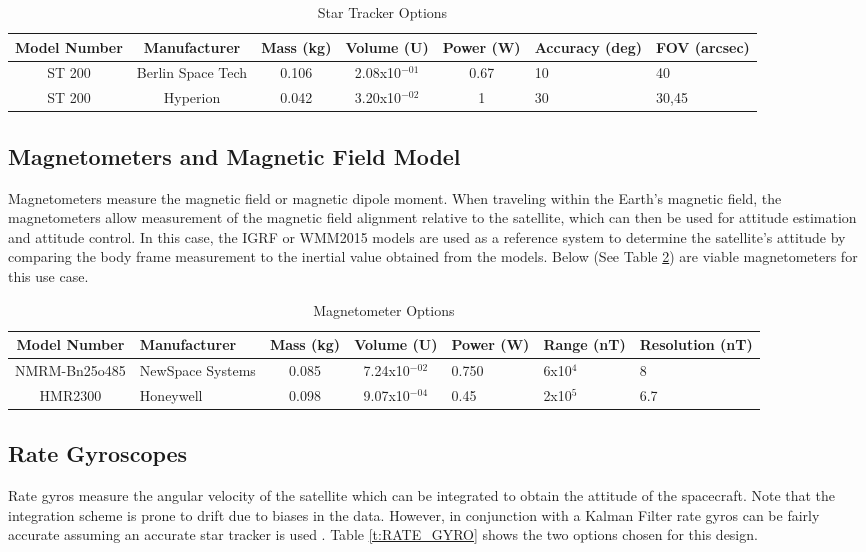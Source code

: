 \documentclass[conf]{new-aiaa}
\begin{document}
\begin{table}[H]
 \centering
 \caption{Star Tracker Options}
 \begin{tabular}[t]{|c|c|c|c|c|p{1.3cm}|p{1.4cm}|}
    \hline
    \textbf{Model Number} & \textbf{Manufacturer} & \textbf{Mass (kg)} & \textbf{Volume (U)} & \textbf{Power (W)} & \textbf{Accuracy (deg)} & \textbf{FOV (arcsec)} \\
    \hline
    ST 200 \cite{ST-200} & Berlin Space Tech & 0.106 & 2.08x10$^{-01}$ & 0.67 & 10 & 40 \\
    \hline
    ST 200 \cite{ST-200H} & Hyperion & 0.042 & 3.20x10$^{-02}$ & 1 & 30 & 30,45  \\
    \hline
\end{tabular}
\label{t:ST}
\end{table}

\subsection{Magnetometers and Magnetic Field Model}
Magnetometers measure the magnetic field or magnetic dipole moment. When traveling within the Earth’s magnetic field, the magnetometers allow measurement of the magnetic field alignment relative to the satellite, which can then be used for attitude estimation and attitude control. In this case, the IGRF or WMM2015 models are used as a reference system to determine the satellite’s attitude by comparing the body frame measurement to the inertial value obtained from the models. Below (See Table \ref{t:MAG}) are viable magnetometers for this use case.

\begin{table}[H]
 \centering
 \caption{Magnetometer Options}
 \begin{tabular}[t]{|c|p{2.0cm}|c|c|p{1.1cm}|p{1.0cm}|p{1.6cm}|}
    \hline
 \textbf{Model Number} & \textbf{Manufacturer} & \textbf{Mass (kg)} & \textbf{Volume (U)} & \textbf{Power (W)} & \textbf{Range (nT)} & \textbf{Resolution (nT)} \\
    \hline
    NMRM-Bn25o485 \cite{NMRM-Bn25o485} & NewSpace Systems & 0.085 & 7.24x10$^{-02}$ & 0.750 & 6x10$^{4}$ & 8  \\
    \hline
    HMR2300 \cite{HMR2300} & Honeywell & 0.098 & 9.07x10$^{-04}$ & 0.45 & 2x10$^{5}$ & 6.7  \\
    \hline
\end{tabular}
\label{t:MAG}
\end{table}

\subsection{Rate Gyroscopes}
Rate gyros measure the angular velocity of the satellite which can be integrated to obtain the attitude of the spacecraft. Note that the integration scheme is prone to drift due to biases in the data. However, in conjunction with a Kalman Filter rate gyros can be fairly accurate assuming an accurate star tracker is used \cite{kalman}. Table \ref{t:RATE_GYRO} shows the two options chosen for this design.
\end{document}
